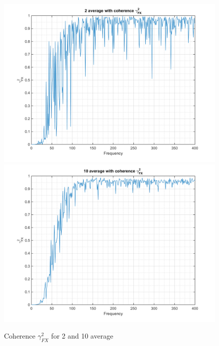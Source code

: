 \documentclass[14pt,a4paper]{article}
\begin{document}
\begin{figure}[htp]
	\centering
	\includegraphics[scale=0.4]{fn4_VB2_1.png}
	\includegraphics[scale=0.4]{fn4_VB2_2.png}
	\caption{Coherence $\gamma_{FX}^2$ for 2 and 10 average}
\end{figure}\\

\pagebreak
\end{document}
